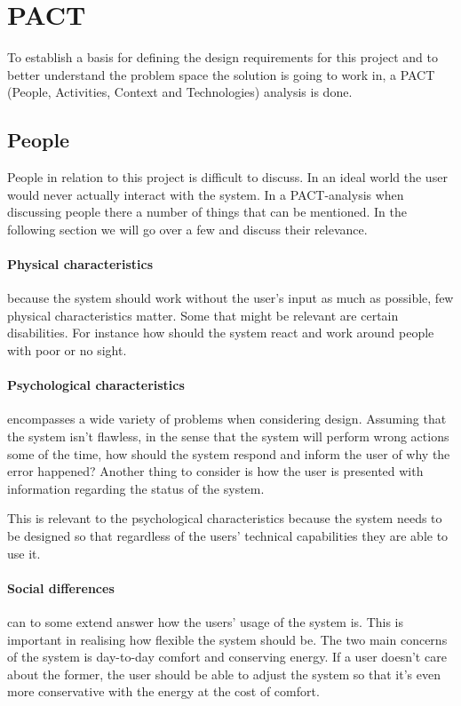 \section{PACT}
To establish a basis for defining the design requirements for this project and
to better understand the problem space the solution is going to work in, a PACT
(People, Activities, Context and Technologies) analysis is done.

\subsection{People}
People in relation to this project is difficult to discuss. In an ideal world the user would never actually interact with the system. In a PACT-analysis when discussing people there a number of things that can be mentioned. In the following section we will go over a few and discuss their relevance.

\paragraph{Physical characteristics} because the system should work without the user's input as much as possible, few physical characteristics matter. Some that might be relevant are certain disabilities. For instance how should the system react and work around people with poor or no sight.

\paragraph{Psychological characteristics} encompasses a wide variety of problems
when considering design. Assuming that the system isn't flawless, in the
  sense that the system will perform wrong actions some of the time, how should
the system respond and inform the user of why the error happened? Another thing
to consider is how the user is presented with information regarding the status
of the system. 

This is relevant to the psychological characteristics because the system needs to be designed so that regardless of the users' technical capabilities they are able to use it.

\paragraph{Social differences} can to some extend answer how the users' usage of
the system is. This is important in realising how flexible the system should be.
The two main concerns of the system is day-to-day comfort and conserving energy.
If a user doesn't care about the former, the user should be able to adjust the system so that it's even more conservative with the energy at the cost of comfort. 

